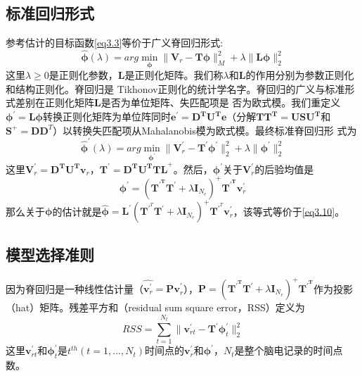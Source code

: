 \subsection{标准回归形式}
参考估计的目标函数\eqref{eq3.3}等价于广义脊回归形式:
\begin{equation}\label{eq3.11}
\hat{\mathbf{\phi}}(\lambda)=arg\min_{\mathbf{\phi}}{\lVert\mathbf{V}_{r}-\mathbf{T\phi}\rVert_{M}^{2}+\lambda\lVert\mathbf{L\phi}\rVert_2^2}
\end{equation}
这里$\lambda\geq{0}$是正则化参数，$\mathbf{L}$是正则化矩阵。我们称$\lambda$和$\mathbf{L}$的作用分别为参数正则化和结构正则化。脊回归是
Tikhonov正则化的统计学名字。脊回归的广义与标准形式差别在正则化矩阵$\mathbf{L}$是否为单位矩阵、失匹配项是
否为欧式模。我们重定义$\mathbf{\phi^\prime=L\phi}$转换正则化矩阵为单位阵同时$\mathbf{e^\prime=D^{T}U^{T}e}$（分解$\mathbf{TT^{T}=USU^{T}}$和$\mathbf{S}^+=\mathbf{DD}^T$）以转换失匹配项从Mahalanobis模为欧式模。最终标准脊回归形
式为
\begin{equation}\label{eq3.12}
\hat{\mathbf{\phi}}^\prime(\lambda)=arg\min_{\mathbf{\phi}^\prime}{\lVert{\mathbf{V}_r^\prime-\mathbf{T^\prime\phi^\prime}}\rVert_2^2+\lambda\lVert{\mathbf{\phi}^\prime}\rVert_2^2}
\end{equation}
这里$\mathbf{V}^\prime_r=\mathbf{D^TU^Tv}_r$，$\mathbf{T}^\prime=\mathbf{D^TU^TTL}^+$。然后，$\mathbf{\phi}^\prime$关于$\mathbf{V}^\prime_r$的后验均值是
\begin{equation}\label{eq3.13}
\mathbf{\phi}^\prime=(\mathbf{T^{\prime^T}}\mathbf{T}^\prime+\lambda\mathbf{I}_{N_e})^+\mathbf{T^{\prime^T}}\mathbf{v}^\prime_r
\end{equation}
那么关于$\mathbf{\phi}$的估计就是$
\hat{\mathbf{\phi}}=\mathbf{L}^\prime(\mathbf{T}^{\prime^T}\mathbf{T}^\prime+\lambda\mathbf{I}_{N_e})^+\mathbf{T}^{\prime^T}\mathbf{v}^\prime_r$，该等式等价于\eqref{eq3.10}。
\subsection{模型选择准则}
因为脊回归是一种线性估计量（$\hat{\mathbf{v}^\prime_r}={\mathbf{Pv}^\prime_r}$），$\mathbf{P}=(\mathbf{T^{\prime^T}}\mathbf{T}^\prime+\lambda\mathbf{I}_{N_{e}})^{+}\mathbf{T^{\prime^T}}$作为投影（hat）矩阵。残差平方和（residual sum square error，RSS）定义为
\begin{equation}
RSS=\sum_{t=1}^{N_{t}}\lVert\mathbf{v}^\prime_{rt}-\mathbf{T}^\prime\mathbf{\phi}^\prime_t\rVert_2^2
\end{equation}
这里$\mathbf{v}^\prime_{rt}$和$\mathbf{\phi}^\prime_{t}$是$t^{th}(t=1,...,N_t)$时间点的$\mathbf{v}^\prime_r$和$\mathbf{\phi}^\prime$，$N_t$是整个脑电记录的时间点数。

